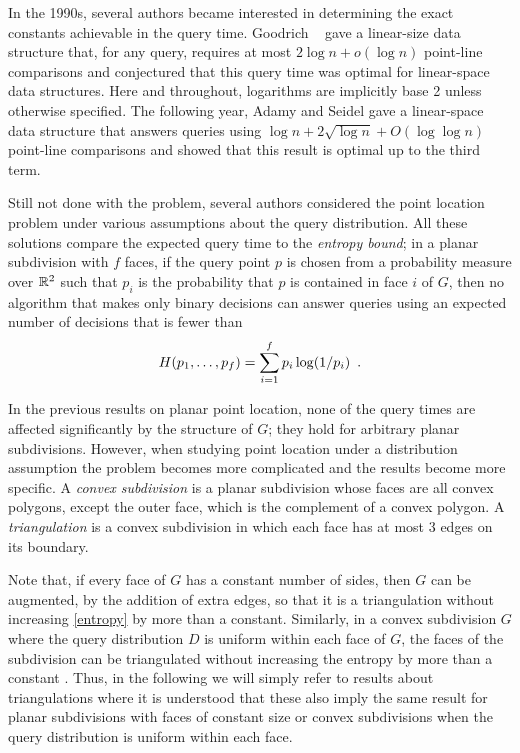 \documentclass[lotsofwhite]{patmorin}
\begin{document}
In the 1990s, several authors became interested in determining the
exact constants achievable in the query time.  Goodrich \etal\
\cite{gor97} gave a linear-size data structure that, for any query,
requires at most $2\log n + o(\log n)$ point-line comparisons and
conjectured that this query time was optimal for linear-space data
structures. Here and throughout, logarithms are implicitly base 2
unless otherwise specified. The following year, Adamy and Seidel
\cite{as98} gave a linear-space data structure that answers queries
using $\log n + 2\sqrt{\log n} + O(\log\log n)$ point-line comparisons
and showed that this result is optimal up to the third term.

Still not done with the problem, several authors considered the point
location problem under various assumptions about the query
distribution.  All these solutions compare the expected query time to
the \emph{entropy bound};  in a planar subdivision with $f$ faces, if the query
point $p$ is chosen from a probability measure over $\mathbb{R}^2$ such that
$p_i$ is the probability that $p$ is contained in face $i$ of $G$,
then no algorithm that makes only binary decisions can answer queries
using an expected number of decisions that is fewer than 
\begin{equation}
    H(p_1,\ldots,p_f) = \sum_{i=1}^f p_i\log(1/p_i) \enspace . 
	\eqlabel{entropy}
	\eqlabel{entropy-face}
\end{equation}

In the previous results on planar point location, none of the query
times are affected significantly by the structure of $G$;  they hold
for arbitrary planar subdivisions.  However, when studying point
location under a distribution assumption the problem becomes more
complicated and the results become more specific.  A \emph{convex
subdivision} is a planar subdivision whose faces are all convex
polygons, except the outer face, which is the complement of a convex
polygon.  A \emph{triangulation} is a convex subdivision in which each
face has at most 3 edges on its boundary.

Note that, if every face of $G$ has a constant number of sides, then
$G$ can be augmented, by the addition of extra edges, so that it is a
triangulation without increasing \eqref{entropy} by more than a
constant.  Similarly, in a convex subdivision $G$ where the query
distribution $D$ is uniform within each face of $G$, the faces of the
subdivision can be triangulated without increasing the entropy by more
than a constant \cite{amm00}. Thus, in the following we will simply
refer to results about triangulations where it is understood that
these also imply the same result for planar subdivisions with faces of
constant size or convex subdivisions when the query distribution is
uniform within each face.
\end{document}
